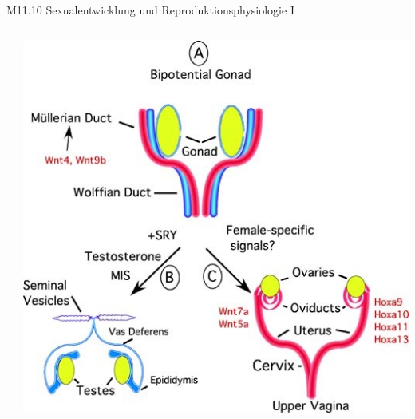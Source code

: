 \documentclass{beamer}
\begin{document}
\begin{frame}{M11.10 Sexualentwicklung und Reproduktionsphysiologie I}
\begin{columns}[c]
\begin{column}{5cm}
\end{column}

\pause

\begin{column}{6cm}

\pause

\begin{center}
\includegraphics[width=\textwidth]{gonad_differentiation.jpg}
\end{center}


\end{column}



\end{columns}

    
\end{frame}







    
\end{document}
